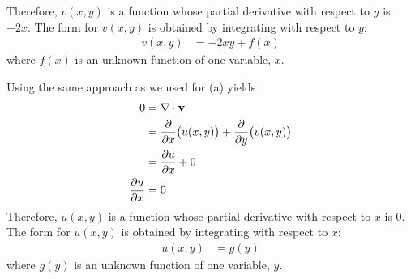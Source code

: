 Therefore, $v(x,y)$ is a function whose partial derivative with respect to $y$ is $-2x$. The  form for $v(x,y)$ is obtained by integrating with respect to $y$:
\begin{align*}
 v(x,y) &= -2xy + f(x)
\end{align*}
where $f(x)$ is an unknown function of one variable, $x$. 
\item Using the same approach as we used for (a) yields
\begin{align*}
  0&= \nabla \cdot \mathbf{v} \\
  &= \frac{\partial}{\partial x} \big(u(x,y)\big) + \frac{\partial}{\partial y} \big(v(x,y)\big) \\
  &=  \frac{\partial u}{\partial x}+ 0\\
   \frac{\partial u}{\partial x} &= 0
\end{align*}
Therefore, $u(x,y)$ is a function whose partial derivative with respect to $x$ is $0$. The  form for $u(x,y)$ is obtained by integrating with respect to $x$:
\begin{align*}
 u(x,y) &= g(y)
\end{align*}
where $g(y)$ is an unknown function of one variable, $y$. 
\EEN

\EEN %
